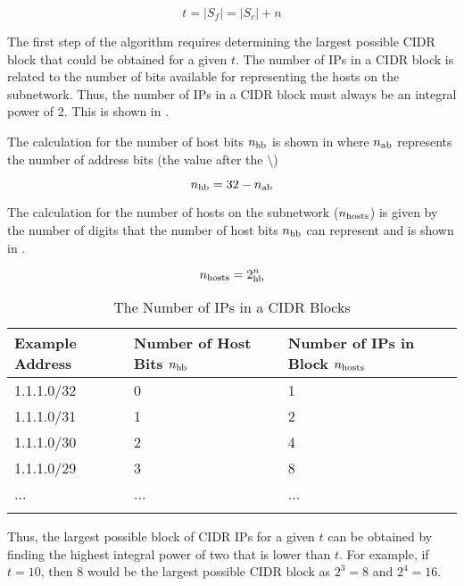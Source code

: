 \begin{equation}
t = |S_f| = |S_c| + n
\end{equation}

The first step of the algorithm requires determining the largest possible CIDR block that could be obtained for a given $t$. The number of IPs in a CIDR block is related to the number of bits available for representing the hosts on the subnetwork. Thus, the number of IPs in a CIDR block must always be an integral power of 2. This is shown in . 

The calculation for the number of host bits $n_\text{hb}$ is shown in  where $n_\text{ab}$ represents the number of address bits (the value after the $\setminus$)

\begin{equation}\label{eq:numHostBits}
n_\text{hb} = 32 - n_\text{ab} 
\end{equation} 

The calculation for the number of hosts on the subnetwork ($n_\text{hosts}$) is given by the number of digits that the number of host bits $n_\text{hb}$ can represent and is shown in .

\begin{equation}\label{eq:numHosts}
n_\text{hosts} = 2^n_\text{hb}
\end{equation}

\begin{table}[b]
\caption{The Number of IPs in a CIDR Blocks}
\label{tbl:cidrBlockSize}
\centering
\begin{tabular}{l l l}
\toprule
\textbf{Example Address} & \textbf{Number of Host Bits $n_\text{hb}$} &\textbf{Number of IPs in Block $n_\text{hosts}$} \\
\midrule
1.1.1.0/32 & 0 & 1\\
1.1.1.0/31 & 1 & 2\\
1.1.1.0/30 & 2 & 4\\
1.1.1.0/29 & 3 & 8\\
... & ... & ...\\
\bottomrule\\
\end{tabular}
\end{table}

Thus, the largest possible block of CIDR IPs for a given $t$ can be obtained by finding the highest integral power of two that is lower than $t$. For example, if $t = 10$, then 8 would be the largest possible CIDR block as $2^3 = 8$ and $2^4 = 16$.

